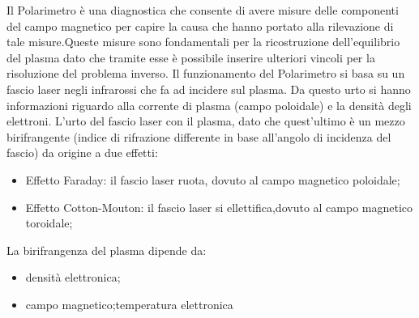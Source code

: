 \documentclass{article}
\begin{document}

Il Polarimetro è una diagnostica che consente di avere misure delle componenti del campo magnetico per capire la causa che hanno portato alla rilevazione di tale misure.Queste misure sono fondamentali per la ricostruzione dell'equilibrio del plasma dato che tramite esse è possibile inserire ulteriori vincoli per la risoluzione del problema inverso.\newline
Il funzionamento del Polarimetro si basa su un fascio laser negli infrarossi che fa ad incidere sul plasma. Da questo urto si hanno informazioni riguardo alla corrente di plasma (campo poloidale) e la densità degli elettroni.\newline
L'urto del fascio laser con il plasma, dato che quest'ultimo è un mezzo birifrangente (indice di rifrazione differente in base all'angolo di incidenza del fascio) da origine a due effetti:
\begin{itemize}
    \item Effetto Faraday: il fascio laser ruota, dovuto al campo magnetico poloidale;
    \item Effetto Cotton-Mouton: il fascio laser si ellettifica,dovuto al campo magnetico toroidale;
\end{itemize}
La birifrangenza del plasma dipende da:
\begin{itemize}
    \item densità elettronica;
    \item campo magnetico;temperatura elettronica
\end{itemize}
\end{document}
